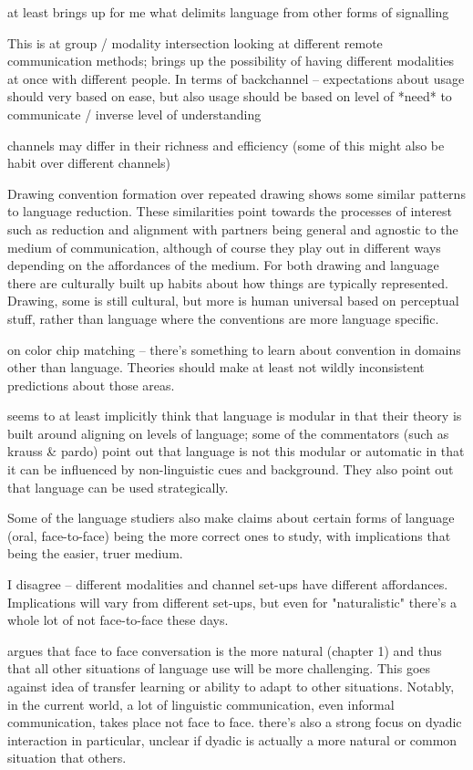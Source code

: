 \documentclass[]{article}
\begin{document}
\cite{clark1996} at least brings up for me what delimits language from other forms of signalling

This is at group / modality intersection \cite{foxtree2013} looking at different remote communication methods; brings up the possibility of having different modalities at once with different people. In terms of backchannel -- expectations about usage should very based on ease, but also usage should be based on level of *need* to communicate / inverse level of understanding 

channels may differ in their richness and efficiency (some of this might also be habit over different channels)

\cite{hawkinsa} Drawing convention formation over repeated drawing shows some similar patterns to language reduction. These similarities point towards the processes of interest such as reduction and alignment with partners being general and agnostic to the medium of communication, although of course they play out in different ways depending on the affordances of the medium. For both drawing and language there are culturally built up habits about how things are typically represented. Drawing, some is still cultural, but more is human universal based on perceptual stuff, rather than language where the conventions are more language specific. 

\cite{murthy2022} on color chip matching -- there's something to learn about convention in domains other than language. Theories should make at least not wildly inconsistent predictions about those areas. 

\cite{pickering2004} seems to at least implicitly think that language is modular in that their theory is built around aligning on levels of language; some of the commentators (such as krauss \& pardo) point out that language is not this modular or automatic in that it can be influenced by non-linguistic cues and background. They also point out that language can be used strategically. 

Some of the language studiers also make claims about certain forms of language (oral, face-to-face) being the more correct ones to study, with implications that being the easier, truer medium. 

I disagree -- different modalities and channel set-ups have different affordances. Implications will vary from different set-ups, but even for "naturalistic" there's a whole lot of not face-to-face these days. 

\cite{clark1996} argues that face to face conversation is the more natural (chapter 1) and thus that all other situations of language use will be more challenging. This goes against idea of transfer learning or ability to adapt to other situations. Notably, in the current world, a lot of linguistic communication, even informal communication, takes place not face to face. there's also a strong focus on dyadic interaction in particular, unclear if dyadic is actually a more natural or common situation that others.
\end{document}
